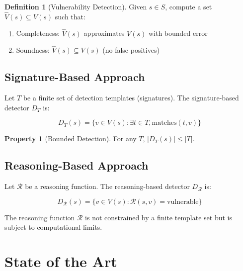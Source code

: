 \documentclass[11pt,a4paper]{article}
\theoremstyle{definition}
\newtheorem{definition}{Definition}[section]
\newtheorem{property}{Property}[section]
\begin{document}
\begin{definition}[Vulnerability Detection]
Given $s \in S$, compute a set $\hat{V}(s) \subseteq V(s)$ such that:
\begin{enumerate}[label=(\roman*)]
    \item Completeness: $\hat{V}(s)$ approximates $V(s)$ with bounded error
    \item Soundness: $\hat{V}(s) \subseteq V(s)$ (no false positives)
\end{enumerate}
\end{definition}

\subsection{Signature-Based Approach}

Let $T$ be a finite set of detection templates (signatures). The signature-based detector $D_T$ is:

\begin{equation}
D_T(s) = \{v \in V(s) : \exists t \in T, \text{matches}(t, v)\}
\end{equation}

\begin{property}[Bounded Detection]
For any $T$, $|D_T(s)| \leq |T|$.
\end{property}

\subsection{Reasoning-Based Approach}

Let $\mathcal{R}$ be a reasoning function. The reasoning-based detector $D_\mathcal{R}$ is:

\begin{equation}
D_\mathcal{R}(s) = \{v \in V(s) : \mathcal{R}(s, v) = \text{vulnerable}\}
\end{equation}

The reasoning function $\mathcal{R}$ is not constrained by a finite template set but is subject to computational limits.

\section{State of the Art}
\label{sec:sota}
\end{document}

